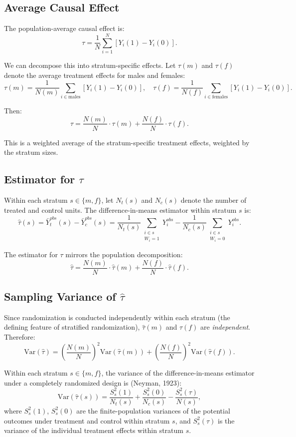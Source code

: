 \documentclass[11pt]{article}
\begin{document}
\subsection*{Average Causal Effect}

The population-average causal effect is:
\[
  \tau = \frac{1}{N} \sum_{i=1}^{N} \left[Y_i(1) - Y_i(0)\right].
\]

We can decompose this into stratum-specific effects. Let $\tau(m)$ and $\tau(f)$ denote the average treatment effects for males and females:
\[
  \tau(m) = \frac{1}{N(m)} \sum_{i \in \text{males}} \left[Y_i(1) - Y_i(0)\right], \quad
  \tau(f) = \frac{1}{N(f)} \sum_{i \in \text{females}} \left[Y_i(1) - Y_i(0)\right].
\]

Then:
\[
  \boxed{\tau = \frac{N(m)}{N} \cdot \tau(m) + \frac{N(f)}{N} \cdot \tau(f).}
\]

This is a weighted average of the stratum-specific treatment effects, weighted by the stratum sizes.

\subsection*{Estimator for $\tau$}

Within each stratum $s \in \{m, f\}$, let $N_t(s)$ and $N_c(s)$ denote the number of treated and control units. The difference-in-means estimator within stratum $s$ is:
\[
  \hat{\tau}(s) = \bar{Y}_t^{obs}(s) - \bar{Y}_c^{obs}(s) = \frac{1}{N_t(s)} \sum_{\substack{i \in s \\ W_i = 1}} Y_i^{obs} - \frac{1}{N_c(s)} \sum_{\substack{i \in s \\ W_i = 0}} Y_i^{obs}.
\]

The estimator for $\tau$ mirrors the population decomposition:
\[
  \boxed{\hat{\tau} = \frac{N(m)}{N} \cdot \hat{\tau}(m) + \frac{N(f)}{N} \cdot \hat{\tau}(f).}
\]

\subsection*{Sampling Variance of $\hat{\tau}$}

Since randomization is conducted independently within each stratum (the defining feature of stratified randomization), $\hat{\tau}(m)$ and $\hat{\tau}(f)$ are \textit{independent}. Therefore:
\[
  \text{Var}(\hat{\tau}) = \left(\frac{N(m)}{N}\right)^2 \text{Var}(\hat{\tau}(m)) + \left(\frac{N(f)}{N}\right)^2 \text{Var}(\hat{\tau}(f)).
\]

Within each stratum $s \in \{m, f\}$, the variance of the difference-in-means estimator under a completely randomized design is (Neyman, 1923):
\[
  \text{Var}(\hat{\tau}(s)) = \frac{S^2_s(1)}{N_t(s)} + \frac{S^2_s(0)}{N_c(s)} - \frac{S^2_s(\tau)}{N(s)},
\]
where $S^2_s(1)$, $S^2_s(0)$ are the finite-population variances of the potential outcomes under treatment and control within stratum $s$, and $S^2_s(\tau)$ is the variance of the individual treatment effects within stratum $s$.
\end{document}

